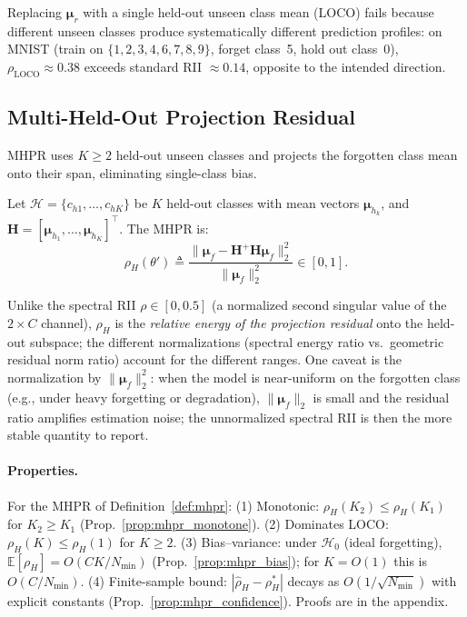 \documentclass[smallextended]{svjour3}       %
\newcommand{\coloneqq}{\triangleq}
\begin{document}
Replacing $\boldsymbol{\mu}_r$ with a single held-out unseen class mean (LOCO) fails because different unseen classes produce systematically different prediction profiles: on MNIST (train on $\{1,2,3,4,6,7,8,9\}$, forget class~5, hold out class~0), $\rho_{\mathrm{LOCO}}{\approx}0.38$ exceeds standard RII ${\approx}0.14$, opposite to the intended direction.

\subsection{Multi-Held-Out Projection Residual}
\label{sec:mhpr}

MHPR uses $K \ge 2$ held-out unseen classes and projects the forgotten class mean onto their span, eliminating single-class bias.

\begin{definition}[MHPR]
\label{def:mhpr}
Let $\mathcal{H} = \{c_{h1},\dots,c_{hK}\}$ be $K$ held-out classes with mean vectors $\boldsymbol{\mu}_{h_k}$, and $\mathbf{H} = [\boldsymbol{\mu}_{h_1},\dots,\boldsymbol{\mu}_{h_K}]^\top$. The MHPR is:
\begin{equation}
\rho_H(\theta') \coloneqq \frac{\|\boldsymbol{\mu}_f - \mathbf{H}^+ \mathbf{H} \boldsymbol{\mu}_f\|_2^2}{\|\boldsymbol{\mu}_f\|_2^2} \in [0,1].
\end{equation}
\end{definition}

Unlike the spectral RII $\rho\in[0,0.5]$ (a normalized second singular value of the $2\times C$ channel), $\rho_H$ is the \emph{relative energy of the projection residual} onto the held-out subspace; the different normalizations (spectral energy ratio vs.\ geometric residual norm ratio) account for the different ranges. One caveat is the normalization by $\|\boldsymbol{\mu}_f\|_2^2$: when the model is near-uniform on the forgotten class (e.g., under heavy forgetting or degradation), $\|\boldsymbol{\mu}_f\|_2$ is small and the residual ratio amplifies estimation noise; the unnormalized spectral RII is then the more stable quantity to report.

\paragraph{Properties.}
For the MHPR of Definition~\ref{def:mhpr}: (1) Monotonic: $\rho_H(K_2) \le \rho_H(K_1)$ for $K_2 \ge K_1$ (Prop.~\ref{prop:mhpr_monotone}). (2) Dominates LOCO: $\rho_H(K) \le \rho_H(1)$ for $K\ge 2$. (3) Bias--variance: under $\mathcal{H}_0$ (ideal forgetting), $\mathbb{E}[\rho_H] = O(CK/N_{\min})$ (Prop.~\ref{prop:mhpr_bias}); for $K=O(1)$ this is $O(C/N_{\min})$. (4) Finite-sample bound: $|\hat{\rho}_H - \rho_H^*|$ decays as $O(1/\sqrt{N_{\min}})$ with explicit constants (Prop.~\ref{prop:mhpr_confidence}). Proofs are in the appendix.
\end{document}
